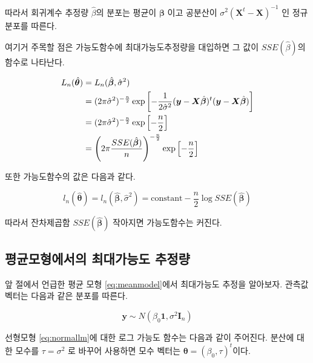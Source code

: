 \documentclass[
]{book}
\theoremstyle{definition}
\theoremstyle{definition}
\theoremstyle{definition}
\theoremstyle{definition}
\theoremstyle{remark}
\begin{document}
따라서 회귀계수 추정량 \(\hat { \beta}\)의 분포는 평균이 \(\bm \beta\) 이고
공분산이 \(\sigma^2( {\bm X}^t - \bm X)^{-1}\) 인 정규분포를 따른다.

여기거 주목할 점은 가능도함수에 최대가능도추정량을 대입하면 그 값이
\(SSE(\hat { \beta})\)의 함수로 나타난다.

\begin{align}
 L_n(\hat { \bm \theta} ) & = L_n(\hat { \bm \beta} ,\hat \sigma^2 ) \notag \\
 &=  (2\pi\hat \sigma^2)^{-\frac{n}{2}} \exp \left [-\frac{1}{2 \hat \sigma^2}( \bm y- \bm X \hat { \bm \beta})^t( \bm y- \bm X \hat { \bm \beta} ) \right ] \notag  \\
& = (2\pi\hat \sigma^2)^{-\frac{n}{2}} \exp \left [-\frac{n}{2} \right ]  \notag  \\
& = \left (2\pi \frac{SSE(\hat { \bm \beta})}{n} \right )^{-\frac{n}{2}} \exp \left [-\frac{n}{2} \right ] 
\label{eq:likefull}
\end{align}

또한 가능도함수의 값은 다음과 같다.

\begin{equation*}
l_n(\hat { \bm \theta} ) = l_n(\hat { \bm \beta} ,\hat \sigma^2 ) 
= \text{constant}  - \frac{n}{2} \log SSE(\hat { \bm \beta})
\end{equation*}

따라서 잔차제곱함 \(SSE(\hat { \bm \beta})\) 작아지면
가능도함수는 커진다.

\hypertarget{uxd3c9uxade0uxbaa8uxd615uxc5d0uxc11cuxc758-uxcd5cuxb300uxac00uxb2a5uxb3c4-uxcd94uxc815uxb7c9}{%
\subsection{평균모형에서의 최대가능도 추정량}\label{uxd3c9uxade0uxbaa8uxd615uxc5d0uxc11cuxc758-uxcd5cuxb300uxac00uxb2a5uxb3c4-uxcd94uxc815uxb7c9}}

앞 절에서 언급한 평균 모형 \eqref{eq:meanmodel}에서 최대가능도 추정을 알아보자. 관측값 벡터는 다음과 같은 분포를 따른다.

\begin{equation}
\bm y \sim N( \beta_0 \bm 1 , \sigma^2 \bm I_n) 
\label{eq:meanlm}
\end{equation}

선형모형 \eqref{eq:normallm}에 대한 로그 가능도 함수는 다음과 같이 주어진다. 분산에 대한 모수를 \(\tau=\sigma^2\) 로 바꾸어 사용하면 모수 벡터는 \(\bm \theta = (\beta_0, \tau)^t\)이다.
\end{document}
